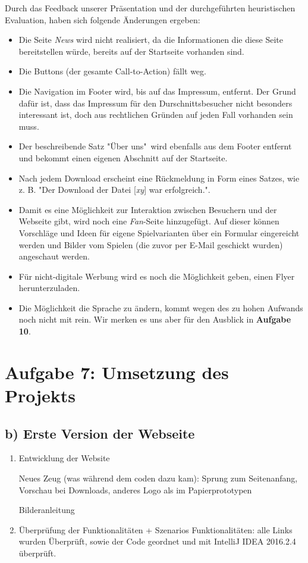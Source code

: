 \documentclass{scrartcl}
\begin{document}
Durch das Feedback unserer Präsentation und der durchgeführten heuristischen Evaluation, haben sich folgende Änderungen ergeben:
\begin{itemize}
\item Die Seite \textit{News} wird nicht realisiert, da die Informationen die diese Seite bereitstellen würde, bereits auf der Startseite vorhanden sind.
\item Die Buttons (der gesamte Call-to-Action) fällt weg.
\item Die Navigation im Footer wird, bis auf das Impressum, entfernt. Der Grund dafür ist, dass das Impressum für den Durschnittsbesucher nicht besonders interessant ist, doch aus rechtlichen Gründen auf jeden Fall vorhanden sein muss.
\item Der beschreibende Satz "Über uns"\ wird ebenfalls aus dem Footer entfernt und bekommt einen eigenen Abschnitt auf der Startseite.
\item Nach jedem Download erscheint eine Rückmeldung in Form eines Satzes, wie z. B. "Der Download der Datei [\textit{xy}] war erfolgreich.".
\item Damit es eine Möglichkeit zur Interaktion zwischen Besuchern und der Webseite gibt, wird noch eine \textit{Fan}-Seite hinzugefügt. Auf dieser können Vorschläge und Ideen für eigene Spielvarianten über ein Formular eingereicht werden und Bilder vom Spielen (die zuvor per E-Mail geschickt wurden) angeschaut werden.
\item Für nicht-digitale Werbung wird es noch die Möglichkeit geben, einen Flyer herunterzuladen.
\item Die Möglichkeit die Sprache zu ändern, kommt wegen des zu hohen Aufwands noch nicht mit rein. Wir merken es uns aber für den Ausblick in \textbf{Aufgabe 10}.
\end{itemize}

\section*{Aufgabe 7: Umsetzung des Projekts}
\subsection*{b) Erste Version der Webseite}
\begin{enumerate}
\item Entwicklung der Website

Neues Zeug (was während dem coden dazu kam): Sprung zum Seitenanfang, Vorschau bei Downloads, anderes Logo als im Papierprototypen

Bilderanleitung
\item Überprüfung der Funktionalitäten + Szenarios
Funktionalitäten: alle Links wurden Überprüft, sowie der Code geordnet und mit IntelliJ IDEA 2016.2.4 überprüft. 

\end{enumerate}
\end{document}

